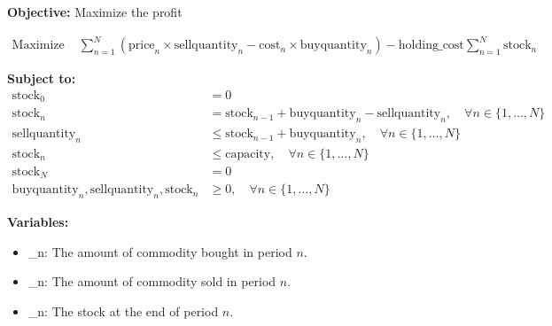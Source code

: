 \documentclass{article}
\begin{document}
\textbf{Objective: } Maximize the profit

\begin{align*}
\text{Maximize } & \sum_{n=1}^{N} (\text{price}_n \times \text{sellquantity}_n - \text{cost}_n \times \text{buyquantity}_n) - \text{holding\_cost} \sum_{n=1}^{N} \text{stock}_n
\end{align*}

\textbf{Subject to:}
\begin{align*}
\text{stock}_0 & = 0 \\
\text{stock}_n & = \text{stock}_{n-1} + \text{buyquantity}_n - \text{sellquantity}_n, \quad \forall n \in \{1, \ldots, N\} \\
\text{sellquantity}_n & \leq \text{stock}_{n-1} + \text{buyquantity}_n, \quad \forall n \in \{1, \ldots, N\} \\
\text{stock}_n & \leq \text{capacity}, \quad \forall n \in \{1, \ldots, N\} \\
\text{stock}_N & = 0 \\
\text{buyquantity}_n, \text{sellquantity}_n, \text{stock}_n & \geq 0, \quad \forall n \in \{1, \ldots, N\}
\end{align*}

\textbf{Variables:}
\begin{itemize}
  \item {}_n: The amount of commodity bought in period \(n\).
  \item {}_n: The amount of commodity sold in period \(n\).
  \item {}_n: The stock at the end of period \(n\).
\end{itemize}
\end{document}
